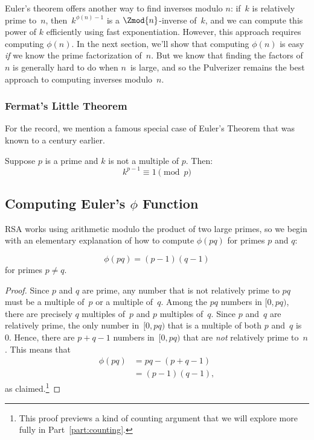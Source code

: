 \medskip
Euler's theorem offers another way to find inverses modulo
$n$: if~$k$ is relatively prime to~$n$, then~$k^{\phi(n)-1}$ is a
$\Zmod{n}$-inverse of~$k$, and we can compute this power of $k$
efficiently using fast exponentiation.  However, this approach
requires computing $\phi(n)$.  In the next section, we'll show that
computing $\phi(n)$ is easy \emph{if} we know the prime factorization
of~$n$.  But we know that finding the factors of~$n$ is generally hard
to do when $n$~is large, and so the Pulverizer remains the best
approach to computing inverses modulo~$n$.

\subsubsection{Fermat's Little Theorem}

For the record, we mention a famous special case of Euler's Theorem
that was known to  a century
earlier.

\begin{corollary}\label{fermat_little}
Suppose $p$ is a prime and $k$ is not a multiple of $p$.  Then:
\[
k^{p-1} \equiv 1 \pmod{p}
\]
\end{corollary}

\subsection{Computing Euler's $\phi$ Function}

RSA works using arithmetic modulo the product of two large primes, so we begin with an
elementary explanation of how to compute $\phi(pq)$ for primes $p$ and $q$:

\begin{lemma}\label{phi_pq}    %
\[
\phi(pq) = (p-1) (q-1)
\]
for primes $p\neq q$.
\end{lemma}

\begin{proof}
Since $p$ and $q$ are prime, any number that is not relatively prime to $pq$ must be a
multiple of~$p$ or a multiple of~$q$.  Among the $pq$ numbers in $[0, pq)$, there are
  precisely $q$ multiples of~$p$ and $p$ multiples of~$q$.  Since $p$ and~$q$ are
  relatively prime, the only number in~$[0, pq)$ that is a multiple of both $p$ and~$q$ is
    0.  Hence, there are $p + q - 1$ numbers in~$[0, pq)$ that are \emph{not} relatively
      prime to~$n$.  This means that
\begin{align*}
    \phi(pq) & = pq - (p + q - 1) \\
& = (p - 1) (q - 1),
\end{align*}
as claimed.\footnote{This proof previews a kind of counting argument that we will explore
  more fully in Part~\ref{part:counting}.}
\end{proof}

